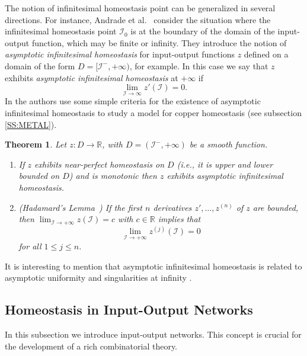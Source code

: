 \documentclass[a4paper,fleqn]{cas-dc}
\newcommand{\II}{{\mathcal I}}
\newtheorem{theorem}{Theorem}[section]
\newcommand{\END}{\hfill\mbox{\raggedright \mbox{\raisebox{2pt}{\scalebox{0.6}{$\Diamond$}}}}\medskip}
\newcommand{\etal}{\textrm{et al.}}
\begin{document}
The notion of infinitesimal homeostasis point can be generalized in several directions.
For instance, Andrade \etal~\cite{andrade2022} consider the situation where the infinitesimal homeostasis point $\II_0$ is at the boundary of the domain of the input-output function, which may be finite or infinity.
They introduce the notion of \emph{asymptotic infinitesimal homeostasis} for input-output functions $z$ defined on a domain of the form $D=[\II^{-},+\infty)$, for example.
In this case we say that $z$ exhibits \emph{asymptotic infinitesimal homeostasis} at $+\infty$ if
\[
 \lim_{\mathcal{I} \to \infty} z'(\mathcal{I}) = 0.
\]
In \cite{andrade2022} the authors use some simple criteria for the existence of asymptotic infinitesimal homeostasis to study a model for copper homeostasis (see subsection \ref{SS:METAL}).

\begin{theorem}
Let $z:D \to \mathbb{R}$, with $D=(\mathcal{I}^{-}, +\infty)$ be a smooth function.
\begin{enumerate}[(1)]
\item If $z$ exhibits near-perfect homeostasis on $D$ (i.e., it is upper and lower bounded on $D$) and is monotonic then $z$ exhibits asymptotic infinitesimal homeostasis.
\item {\rm (Hadamard's Lemma~\cite{hadamard1914})} If the first $n$ derivatives $z',\ldots,z^{(n)}$ of $z$ are bounded, then $\displaystyle\lim_{\II\to+\infty}z(\II)=c$ with $c\in \mathbb{R}$ implies that
\[
 \lim_{\II\to+\infty} z^{(j)}(\II)=0 
\]
for all $1\leq j \leq n$.
\end{enumerate}
\end{theorem}

It is interesting to mention that asymptotic infinitesimal homeostasis is related to asymptotic uniformity \cite{gabriel2023} and singularities at infinity \cite{tibuar1999}.

\subsection{Homeostasis in Input-Output Networks}
\label{SS:HION}

In this subsection we introduce input-output networks.
This concept is crucial for the development of a rich combinatorial theory.

\end{document}
